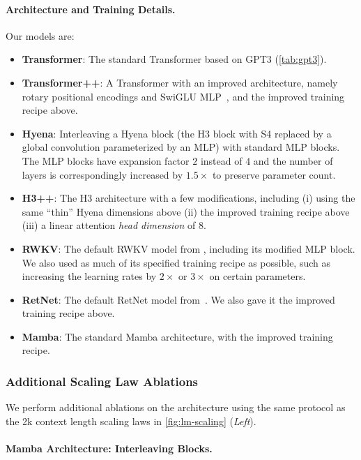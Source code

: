 \paragraph{Architecture and Training Details.}

Our models are:
\begin{itemize}[leftmargin=*,itemsep=0pt]
  \item \textbf{Transformer}: The standard Transformer based on GPT3 (\cref{tab:gpt3}).
  \item \textbf{Transformer++}: A Transformer with an improved architecture, namely rotary positional encodings \citep{su2021roformer} and SwiGLU MLP~\citep{shazeer2020glu}, and the improved training recipe above.
  \item \textbf{Hyena}: Interleaving a Hyena block (the H3 block with S4 replaced by a global convolution parameterized by an MLP) with standard MLP blocks.
    The MLP blocks have expansion factor $2$ instead of $4$ and the number of layers is correspondingly increased by $1.5\times$ to preserve parameter count.
  \item \textbf{H3++}: The H3 architecture with a few modifications, including (i) using the same ``thin'' Hyena dimensions above (ii) the improved training recipe above (iii) a linear attention \emph{head dimension} of 8.
  \item \textbf{RWKV}: The default RWKV model from \citet{peng2023rwkv}, including its modified MLP block. We also used as much of its specified training recipe as possible, such as increasing the learning rates by $2\times$ or $3\times$ on certain parameters.
  \item \textbf{RetNet}: The default RetNet model from~\citet{sun2023retentive}. We also gave it the improved training recipe above.
  \item \textbf{Mamba}: The standard Mamba architecture, with the improved training recipe.
\end{itemize}

\subsubsection{Additional Scaling Law Ablations}
\label{sec:exp-details:lm:scaling-ablations}

We perform additional ablations on the architecture using the same protocol as the 2k context length scaling laws in \cref{fig:lm-scaling} (\emph{Left}).

\paragraph{Mamba Architecture: Interleaving Blocks.}

